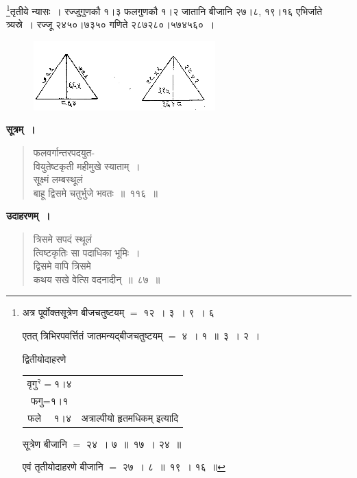 \documentclass[11pt, openany]{book}
\begin{document}
\footnote{अत्र पूर्वोक्तसूत्रेण बीजचतुष्टयम् $=$ १२~। ३~। ९~। ६ 
\vspace{1mm}

\hspace{3mm} एतत् त्रिभिरपवर्त्तितं जातमन्यद्बीजचतुष्टयम् $=$ ४~। १~॥~३~। २~। 
\vspace{1mm}

\hspace{3mm} द्वितीयोदाहरणे \begin{tabular}{cl}
 $\mbox{वृगु}^{\text{२}} = \mbox{१।४}$  & \hspace{-2mm} \multirow{2}{*}{$\bigg\}$}  \\
    $\mbox{फगु} = \mbox{१।१}$ & \\
    फले ~~१।४ & अत्राल्पीयो हृतमधिकम् इत्यादि 
\end{tabular}

\hspace{3mm} सूत्रेण बीजानि $=$ २४~। ७~॥~१७~। २४~॥
\vspace{1mm}

\hspace{3mm} एवं तृतीयोदाहरणे बीजानि $=$ २७~। ८~॥~१९~। १६~॥}तृतीये न्यासः~। रज्जुगुणकौ १।३ फलगुणकौ १।२ जातानि बीजानि
२७।८, १९।१६ एभिर्जाते त्र्यस्रे~। रज्जू २४५०।७३५० गणिते
२८७२८०।५७४५६०~।
\vspace{-4mm}

\begin{figure}[h!]
     \centering
     \includegraphics[scale=0.85]{graphics/capture138.png}
\end{figure} 

\textbf{सूत्रम्~।} 
\begin{quote}
    \bs
    फलवर्गान्तरपदयुत-\\
वियुतेष्टकृती महीमुखे स्याताम्~। \\
सूक्ष्मं लम्बस्थूलं \\
बाहू द्विसमे चतुर्भुजे भवतः~॥~११६~॥
\end{quote}


\newpage%
\textbf{उदाहरणम्~।} 
\begin{quote}
    \bqt 
    त्रिसमे सपदं स्थूलं \\
त्विष्टकृतिः सा पदाधिका भूमिः~। \\
द्विसमे वापि त्रिसमे \\
कथय सखे वेत्सि वदनादीन्~॥~८७~॥~
\end{quote}
\end{document}
